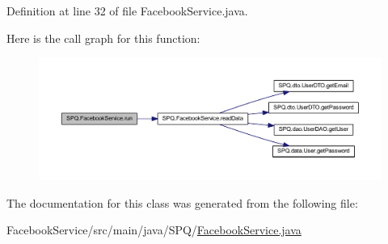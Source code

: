 Definition at line 32 of file Facebook\+Service.\+java.

Here is the call graph for this function\+:
\nopagebreak
\begin{figure}[H]
\begin{center}
\leavevmode
\includegraphics[width=350pt]{class_s_p_q_1_1_facebook_service_a24a62bc6a32966419548314bc417abfb_cgraph}
\end{center}
\end{figure}


The documentation for this class was generated from the following file\+:\begin{DoxyCompactItemize}
\item 
Facebook\+Service/src/main/java/\+S\+P\+Q/\mbox{\hyperlink{_facebook_service_8java}{Facebook\+Service.\+java}}\end{DoxyCompactItemize}
